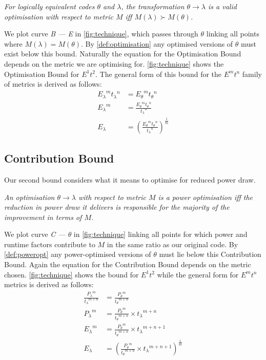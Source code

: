 \begin{definition}
\textit{For logically equivalent codes $\theta$ and $\lambda$, the transformation ${\theta \to \lambda}$ is a valid optimisation with respect to metric $M$ iff ${M(\lambda) \succ M(\theta)}$.}
\label{def:optimisation}
\end{definition}

\noindent
We plot curve \emph{B --- E} in \autoref{fig:technique}, which passes through $\theta$ linking all points where ${M(\lambda) = M(\theta)}$. 
By \autoref{def:optimisation} any optimised versions of $\theta$ must exist below this bound.
Naturally the equation for the Optimisation Bound depends on the metric we are optimising for.
\autoref{fig:technique} shows the Optimisation Bound for $E^1t^2$.
The general form of this bound for the $E^mt^n$ family of metrics is derived as follows:
\begin{align}
 {E_\lambda}^m{t_\lambda}^n &= {E_\theta}^m{t_\theta}^n \nonumber \\
 {E_\lambda}^m &= \frac{{E_\theta}^m{t_\theta}^n}{{t_\lambda}^n} \nonumber \\
  E_\lambda &= (\frac{{E_\theta}^m{t_\theta}^n}{{t_\lambda}^n})^\frac{1}{m}
\label{eq:optimisation}
\end{align}

\subsection{Contribution Bound}
\noindent
Our second bound considers what it means to optimise for reduced power draw.
\begin{definition}
\textit{An optimisation $\theta \to \lambda$ with respect to metric $M$ is a power optimisation iff the reduction in power draw it delivers is responsible for the majority of the improvement in terms of $M$.}
\label{def:poweropt}
\end{definition}

\noindent
We plot curve \emph{C --- $\theta$} in \autoref{fig:technique} linking all points for which power and runtime factors contribute to $M$ in the same ratio as our original code.
By \autoref{def:poweropt} any power-optimised versions of $\theta$ must lie below this Contribution Bound.
Again the equation for the Contribution Bound depends on the metric chosen. 
\autoref{fig:technique} shows the bound for $E^1t^2$ while the general form for $E^mt^n$ metrics is derived as follows:
\begin{align}
\frac{{P_{\lambda}}^m}{{t_{\lambda}}^{m+n}} &= \frac{{P_{\theta}}^m}{{t_{\theta}}^{m+n}} \nonumber \\
 {P_{\lambda}}^m &= \frac{{P_{\theta}}^m}{{t_{\theta}}^{m+n}} \times {t_\lambda}^{m+n} \nonumber \\ 
 {E_{\lambda}}^m &= \frac{{P_{\theta}}^m}{{t_{\theta}}^{m+n}} \times {t_\lambda}^{m+n+1} \nonumber \\ 
  E_{\lambda} &= (\frac{{P_{\theta}}^m}{{t_{\theta}}^{m+n}} \times {t_\lambda}^{m+n+1})^{\frac{1}{m}} 
\end{align}


